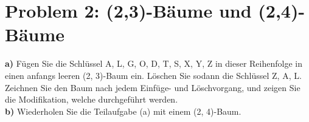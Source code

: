 \section*{Problem 2: (2,3)-Bäume und (2,4)-Bäume} 


\textbf{a)} Fügen Sie die Schlüssel A, L, G, O, D, T, S, X, Y, Z in dieser Reihenfolge in einen anfangs leeren (2, 3)-Baum ein. Löschen Sie sodann die Schlüssel Z, A, L. Zeichnen Sie den Baum nach jedem Einfüge- und Löschvorgang, und zeigen Sie die Modifikation, welche durchgeführt werden. \\

\noindent
\textbf{b)} Wiederholen Sie die Teilaufgabe (a) mit einem (2, 4)-Baum. \\




